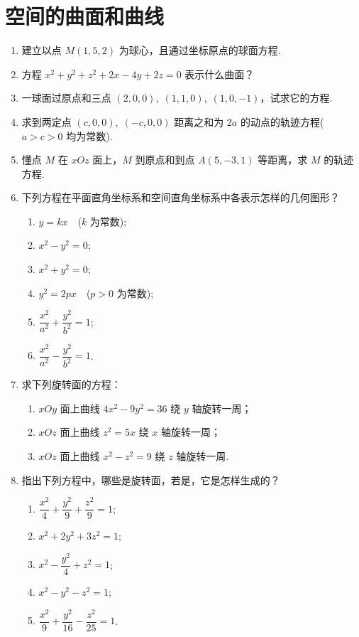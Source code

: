\section{空间的曲面和曲线}

\begin{enumerate}\setlength{\itemsep}{7pt}
    \item 建立以点 $M(1, 5, 2)$ 为球心，且通过坐标原点的球面方程.
    
    \item 方程 $x^2+y^2+z^2+2x-4y+2z=0$ 表示什么曲面？
    
    \item 一球面过原点和三点 $(2, 0, 0),\;(1, 1, 0),\;(1, 0, -1)$，试求它的方程.
    
    \item 求到两定点 $(c, 0, 0),\;(-c, 0, 0)$ 距离之和为 $2a$ 的动点的轨迹方程($a>c>0$ 均为常数).
    
    \item 懂点 $M$ 在 $xOz$ 面上，$M$ 到原点和到点 $A(5, -3, 1)$ 等距离，求 $M$ 的轨迹方程.
    
    \item 下列方程在平面直角坐标系和空间直角坐标系中各表示怎样的几何图形？
    \begin{enumerate}[(1)]\setlength{\itemsep}{5pt}\setlength{\topsep}{15pt}
        \item $y=kx\quad$($k$ 为常数);
        \item $x^2-y^2=0$;
        \item $x^2+y^2=0$;
        \item $y^2=2px\quad$($p>0$ 为常数);
        \item $\dfrac{x^2}{a^2}+\dfrac{y^2}{b^2}=1$;
        \item $\dfrac{x^2}{a^2}-\dfrac{y^2}{b^2}=1$.
    \end{enumerate}

    \item 求下列旋转面的方程：
    \begin{enumerate}[(1)]\setlength{\itemsep}{5pt}\setlength{\topsep}{15pt}
        \item $xOy$ 面上曲线 $4x^2-9y^2=36$ 绕 $y$ 轴旋转一周；
        \item $xOz$ 面上曲线 $z^2=5x$ 绕 $x$ 轴旋转一周；
        \item $xOz$ 面上曲线 $x^2-z^2=9$ 绕 $z$ 轴旋转一周.
    \end{enumerate}

    \item 指出下列方程中，哪些是旋转面，若是，它是怎样生成的？
    \begin{enumerate}[(1)]\setlength{\itemsep}{5pt}\setlength{\topsep}{15pt}
        \item $\dfrac{x^2}{4}+\dfrac{y^2}{9}+\dfrac{z^2}{9}=1$;
        \item $x^2+2y^2+3z^2=1$;
        \item $x^2-\dfrac{y^2}{4}+z^2=1$;
        \item $x^2-y^2-z^2=1$;
        \item $\dfrac{x^2}{9}+\dfrac{y^2}{16}-\dfrac{z^2}{25}=1$.
    \end{enumerate}


\end{enumerate}
